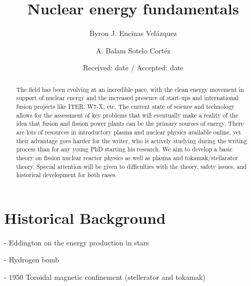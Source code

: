 \documentclass[smallextended]{svjour3}
\begin{document}
\title{Nuclear energy fundamentals}

\author{Byron J. Encinas Velázquez \and A. Balam Sotelo Cortéz
}


\date{Received: date / Accepted: date}

\maketitle

\begin{abstract}
The field has been evolving at an incredible pace, with the clean energy movement in support of nuclear energy and the increased presence of start-ups and international fusion projects like ITER, W7-X, etc. The current state of science and technology allows for the assessment of key problems that will eventually make a reality of the idea that fusion and fission power plants can be the primary sources of energy. There are lots of resources in introductory plasma and nuclear physics available online, yet their advantage goes harder for the writer, who is actively studying during the writing process than for any young PhD starting his research.  We aim to develop a basic theory on fission nuclear reactor physics as well as plasma and tokamak/stellarator theory. Special attention will be given to difficulties with the theory, safety issues, and historical development for both cases. 

\end{abstract}

\newpage

\section{Historical Background}

- Eddington on the energy production in stars

- Hydrogen bomb

- 1950 Toroidal magnetic confinement (stellerator and tokamak)
\end{document}
